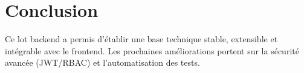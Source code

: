 \chapter*{Conclusion}

Ce lot backend a permis d'établir une base technique stable, extensible et intégrable avec le frontend. Les prochaines améliorations portent sur la sécurité avancée (JWT/RBAC) et l'automatisation des tests.
